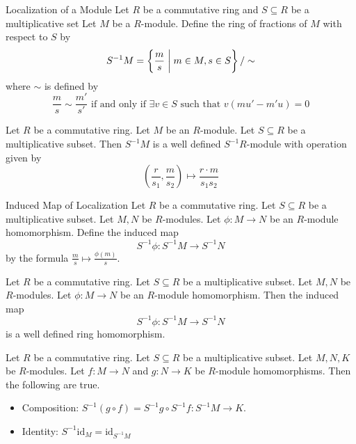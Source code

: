 \documentclass[a4paper]{article}
\begin{document}
\begin{defn}{Localization of a Module}{} Let $R$ be a commutative ring and $S\subseteq R$ be a multiplicative set Let $M$ be a $R$-module. Define the ring of fractions of $M$ with respect to $S$ by $$S^{-1}M=\left\{\frac{m}{s}\;\bigg{|}\;m\in M,s\in S\right\}/\sim$$ where $\sim$ is defined by $$\frac{m}{s}\sim\frac{m'}{s'}\text{ if and only if }\exists v\in S\text{ such that }v(mu'-m'u)=0$$
\end{defn}

\begin{lmm}{}{} Let $R$ be a commutative ring. Let $M$ be an $R$-module. Let $S\subseteq R$ be a multiplicative subset. Then $S^{-1}M$ is a well defined $S^{-1}R$-module with operation given by $$\left(\frac{r}{s_1},\frac{m}{s_2}\right)\mapsto\frac{r\cdot m}{s_1s_2}$$
\end{lmm}

\begin{defn}{Induced Map of Localization}{} Let $R$ be a commutative ring. Let $S\subseteq R$ be a multiplicative subset. Let $M,N$ be $R$-modules. Let $\phi:M\to N$ be an $R$-module homomorphism. Define the induced map $$S^{-1}\phi:S^{-1}M\to S^{-1}N$$ by the formula $\frac{m}{s}\mapsto\frac{\phi(m)}{s}$. 
\end{defn}

\begin{lmm}{}{} Let $R$ be a commutative ring. Let $S\subseteq R$ be a multiplicative subset. Let $M,N$ be $R$-modules. Let $\phi:M\to N$ be an $R$-module homomorphism. Then the induced map $$S^{-1}\phi:S^{-1}M\to S^{-1}N$$ is a well defined ring homomorphism. 
\end{lmm}

\begin{lmm}{}{} Let $R$ be a commutative ring. Let $S\subseteq R$ be a multiplicative subset. Let $M,N,K$ be $R$-modules. Let $f:M\to N$ and $g:N\to K$ be $R$-module homomorphisms. Then the following are true. 
\begin{itemize}
\item Composition: $S^{-1}(g\circ f)=S^{-1}g\circ S^{-1}f:S^{-1}M\to K$. 
\item Identity: $S^{-1}\text{id}_M=\text{id}_{S^{-1}M}$
\end{itemize}
\end{lmm}
\end{document}

